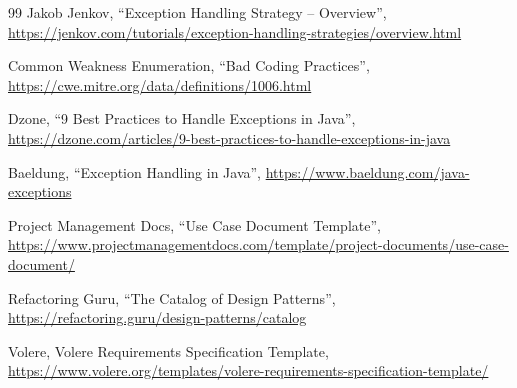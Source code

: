 \begin{thebibliography}{99}
 Jakob Jenkov, ``Exception Handling Strategy -- Overview'', \url{https://jenkov.com/tutorials/exception-handling-strategies/overview.html}

 Common Weakness Enumeration, ``Bad Coding Practices'', \url{https://cwe.mitre.org/data/definitions/1006.html}

 Dzone, ``9 Best Practices to Handle Exceptions in Java'', \url{https://dzone.com/articles/9-best-practices-to-handle-exceptions-in-java}

 Baeldung, ``Exception Handling in Java'', \url{https://www.baeldung.com/java-exceptions}

 Project Management Docs, ``Use Case Document Template'', \url{https://www.projectmanagementdocs.com/template/project-documents/use-case-document/}

 Refactoring Guru, ``The Catalog of Design Patterns'', \url{https://refactoring.guru/design-patterns/catalog}

 Volere, Volere Requirements Specification Template, \url{https://www.volere.org/templates/volere-requirements-specification-template/}

\end{thebibliography}
